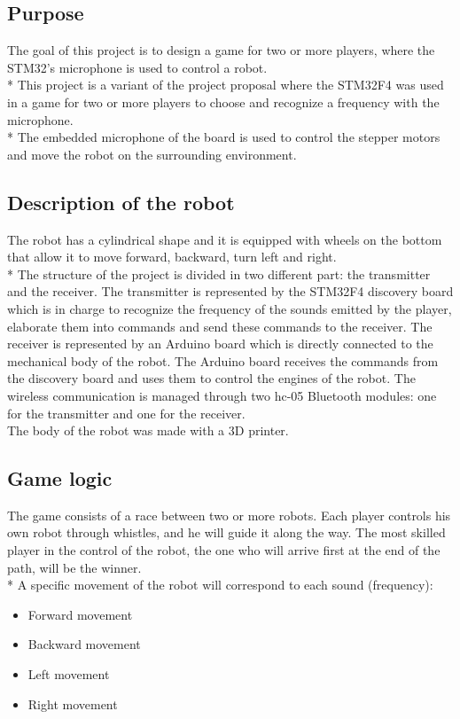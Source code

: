 \subsection{Purpose}
The goal of this project is to design a game for two or more players, where the STM32’s microphone is used to control a robot.\\*
This project is a variant of the project proposal where the STM32F4 was used in a game for two or more players to choose and recognize a frequency with the microphone.\\*
The embedded microphone of the board is used to control the stepper motors and move the robot on the surrounding environment.

\subsection{Description of the robot}
The robot has a cylindrical shape and it is equipped with wheels on the bottom that allow it to move forward, backward, turn left and right.\\*
The structure of the project is divided in two different part: the transmitter and the receiver.
The transmitter is represented by the STM32F4 discovery board which is in charge to recognize the frequency of the sounds emitted by the player, elaborate them into commands and send these commands to the receiver.
The receiver is represented by an Arduino board which is directly connected to the mechanical body of the robot. The Arduino board receives the commands from the discovery board and uses them to control the engines of the robot.
The wireless communication is managed through two hc-05 Bluetooth modules: one for the transmitter and one for the receiver.\\
The body of the robot was made with a 3D printer.

\subsection{Game logic}
The game consists of a race between two or more robots. Each player controls his own robot through whistles, and he will guide it along the way. The most skilled player in the control of the robot, the one who will arrive first at the end of the path, will be the winner.\\*
A specific movement of the robot will correspond to each sound (frequency):
\begin{itemize}
	\item Forward movement
	\item Backward movement
	\item Left movement
	\item Right movement
\end{itemize}

